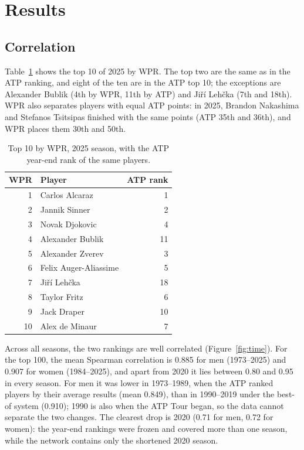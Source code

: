 \documentclass[11pt]{article}
\begin{document}
\section{Results}

\subsection{Correlation}

Table~\ref{tab:top10} shows the top 10 of 2025 by WPR. The top two are the same as in the ATP ranking, and eight of the ten are in the ATP top 10; the exceptions are Alexander Bublik (4th by WPR, 11th by ATP) and Ji\v{r}\'i Leh\v{c}ka (7th and 18th). WPR also separates players with equal ATP points: in 2025, Brandon Nakashima and Stefanos Tsitsipas finished with the same points (ATP 35th and 36th), and WPR places them 30th and 50th.

\begin{table}[!htbp]
\centering
\small
\caption{Top 10 by WPR, 2025 season, with the ATP year-end rank of the same players.}
\label{tab:top10}
\begin{tabular}{@{}rlr@{}}
\toprule
WPR & Player & ATP rank \\
\midrule
1 & Carlos Alcaraz & 1 \\
2 & Jannik Sinner & 2 \\
3 & Novak Djokovic & 4 \\
4 & Alexander Bublik & 11 \\
5 & Alexander Zverev & 3 \\
6 & Felix Auger-Aliassime & 5 \\
7 & Ji\v{r}\'i Leh\v{c}ka & 18 \\
8 & Taylor Fritz & 6 \\
9 & Jack Draper & 10 \\
10 & Alex de Minaur & 7 \\
\bottomrule
\end{tabular}
\end{table}

Across all seasons, the two rankings are well correlated (Figure~\ref{fig:time}). For the top 100, the mean Spearman correlation is 0.885 for men (1973--2025) and 0.907 for women (1984--2025), and apart from 2020 it lies between 0.80 and 0.95 in every season. For men it was lower in 1973--1989, when the ATP ranked players by their average results (mean 0.849), than in 1990--2019 under the best-of system (0.910); 1990 is also when the ATP Tour began, so the data cannot separate the two changes. The clearest drop is 2020 (0.71 for men, 0.72 for women): the year-end rankings were frozen and covered more than one season, while the network contains only the shortened 2020 season.
\end{document}

